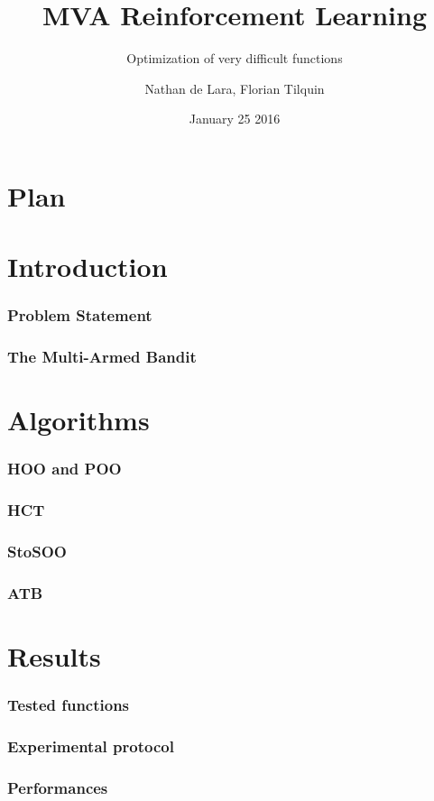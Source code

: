 \documentclass[xcolor={usenames,dvipsnames}]{beamer}
\begin{document}

\title{MVA Reinforcement Learning}
\subtitle{Optimization of very difficult functions}
\author{Nathan de Lara, Florian Tilquin}
\date{January 25 2016} 


\begin{frame}
\titlepage
\end{frame}

\usebackgroundtemplate{ }

\section*{Plan}
\begin{frame}
  \tableofcontents[]
\end{frame}

\section{Introduction}
\begin{frame}
\frametitle{Problem Statement}
\end{frame}

\begin{frame}
\frametitle{The Multi-Armed Bandit}
\end{frame}

\section{Algorithms}
\begin{frame}
\frametitle{HOO and POO}
\end{frame}

\begin{frame}
\frametitle{HCT}
\end{frame}

\begin{frame}
\frametitle{StoSOO}
\end{frame}

\begin{frame}
\frametitle{ATB}
\end{frame}

\section{Results}
\begin{frame}
\frametitle{Tested functions}
\end{frame}

\begin{frame}
\frametitle{Experimental protocol}
\end{frame}

\begin{frame}
\frametitle{Performances}
\end{frame}
\end{document}
